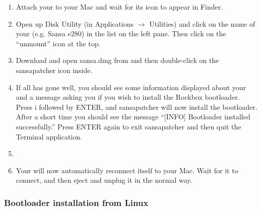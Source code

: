 \begin{enumerate}

\item Attach your \dap{} to your Mac and wait for its icon to appear in 
Finder.

\item\label{subsec:macos_umount} Open up Disk Utility
(in Applications $\rightarrow$ Utilities) and click 
on the name of your \dap{} (e.g. Sansa e280) in the list on the left 
pane. Then click on the ``unmount'' icon at the top. 

\item Download and open sansa.dmg from 
and then double-click on the sansapatcher icon inside. 

\item If all has gone well, you should see some 
information displayed about your \dap{} and a message asking you if you 
wish to install the Rockbox bootloader. Press i followed by ENTER, and 
sansapatcher will now install the bootloader. After a short time you 
should see the message ``[INFO] Bootloader installed successfully.'' Press 
ENTER again to exit sansapatcher and then quit the Terminal application.

\item {}

\item Your \dap{} will now automatically reconnect itself to your Mac. 
Wait for it to connect, and then eject and unplug it in the normal way. 

\end{enumerate}

\subsubsection{Bootloader installation from Linux}

